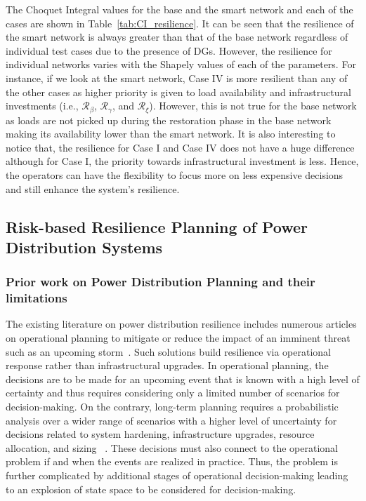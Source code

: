 \documentclass[hidelinks, 12pt]{article}
\begin{document}
The Choquet Integral values for the base and the smart network and each of the cases are shown in Table~\ref{tab:CI_resilience}. It can be seen that the resilience of the smart network is always greater than that of the base network regardless of individual test cases due to the presence of DGs. However, the resilience for individual networks varies with the Shapely values of each of the parameters. For instance, if we look at the smart network, Case IV is more resilient than any of the other cases as higher priority is given to load availability and infrastructural investments (i.e., $\mathcal{R}_\beta$, $\mathcal{R}_\gamma$, and $\mathcal{R}_\xi$). However, this is not true for the base network as loads are not picked up during the restoration phase in the base network making its availability lower than the smart network. It is also interesting to notice that, the resilience for Case I and Case IV does not have a huge difference although for Case I, the priority towards infrastructural investment is less. Hence, the operators can have the flexibility to focus more on less expensive decisions and still enhance the system's resilience.       


\newpage
\subsection{Risk-based Resilience Planning of Power Distribution Systems}
\subsubsection{Prior work on Power Distribution Planning and their limitations}
The existing literature on power distribution resilience includes numerous articles on operational planning to mitigate or reduce the impact of an imminent threat such as an upcoming storm~\cite{8409997}. Such solutions build resilience via operational response rather than infrastructural upgrades. In operational planning, the decisions are to be made for an upcoming event that is known with a high level of certainty and thus requires considering only a limited number of scenarios for decision-making. On the contrary, long-term planning requires a probabilistic analysis over a wider range of scenarios with a higher level of uncertainty for decisions related to system hardening, infrastructure upgrades, resource allocation, and sizing ~\cite{7381672}. These decisions must also connect to the operational problem if and when the events are realized in practice. Thus, the problem is further complicated by additional stages of operational decision-making leading to an explosion of state space to be considered for decision-making. 
\end{document}
